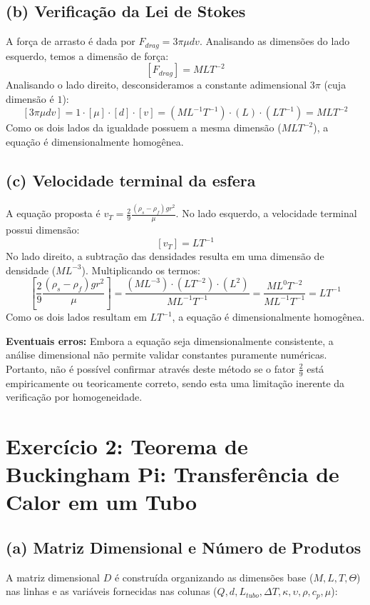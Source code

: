 \documentclass{article}
\begin{document}
\subsection*{(b) Verificação da Lei de Stokes}
A força de arrasto é dada por $F_{drag} = 3\pi\mu dv$. 
Analisando as dimensões do lado esquerdo, temos a dimensão de força:
\[ [F_{drag}] = MLT^{-2} \]
Analisando o lado direito, desconsideramos a constante adimensional $3\pi$ (cuja dimensão é $1$):
\[ [3\pi\mu dv] = 1 \cdot [\mu] \cdot [d] \cdot [v] = (ML^{-1}T^{-1}) \cdot (L) \cdot (LT^{-1}) = MLT^{-2} \]
Como os dois lados da igualdade possuem a mesma dimensão ($MLT^{-2}$), a equação é dimensionalmente homogênea.

\subsection*{(c) Velocidade terminal da esfera}
A equação proposta é $v_T = \frac{2}{9}\frac{(\rho_s - \rho_f)gr^2}{\mu}$.
No lado esquerdo, a velocidade terminal possui dimensão:
\[ [v_T] = LT^{-1} \]
No lado direito, a subtração das densidades resulta em uma dimensão de densidade ($ML^{-3}$). Multiplicando os termos:
\[ \left[\frac{2}{9}\frac{(\rho_s - \rho_f)gr^2}{\mu}\right] = \frac{(ML^{-3}) \cdot (LT^{-2}) \cdot (L^2)}{ML^{-1}T^{-1}} = \frac{ML^0T^{-2}}{ML^{-1}T^{-1}} = LT^{-1} \]
Como os dois lados resultam em $LT^{-1}$, a equação é dimensionalmente homogênea. 

\textbf{Eventuais erros:} Embora a equação seja dimensionalmente consistente, a análise dimensional não permite validar constantes puramente numéricas. Portanto, não é possível confirmar através deste método se o fator $\frac{2}{9}$ está empiricamente ou teoricamente correto, sendo esta uma limitação inerente da verificação por homogeneidade.

\section*{Exercício 2: Teorema de Buckingham Pi: Transferência de Calor em um Tubo}

\subsection*{(a) Matriz Dimensional e Número de Produtos}
A matriz dimensional $D$ é construída organizando as dimensões base ($M, L, T, \Theta$) nas linhas e as variáveis fornecidas nas colunas ($Q, d, L_{tubo}, \Delta T, \kappa, \upsilon, \rho, c_p, \mu$):
\end{document}
